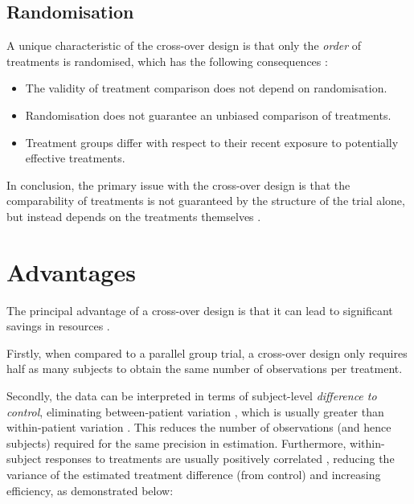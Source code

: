\documentclass[12pt, TexShade, letterpaper]{report}
\begin{document}
\subsection{Randomisation}
A unique characteristic of the cross-over design is that only the \textit{order} of treatments is randomised, which has the following consequences \cite{piantadosi2005clinical}:
\begin{itemize}
    \item The validity of treatment comparison does not depend on randomisation.
    \item Randomisation does not guarantee an unbiased comparison of treatments.
    \item Treatment groups differ with respect to their recent exposure to potentially effective treatments.
\end{itemize}
In conclusion, the primary issue with the cross-over design is that the comparability of treatments is not guaranteed by the structure of the trial alone, but instead depends on the treatments themselves \cite{piantadosi2005clinical}.

\section{Advantages}
The principal advantage of a cross-over design is that it can lead to significant savings in resources \cite{senn2002crossover}.

Firstly, when compared to a parallel group trial, a cross-over design only requires half as many subjects to obtain the same number of observations per treatment. 

Secondly, the data can be interpreted in terms of subject-level \textit{difference to control}, eliminating between-patient variation \cite{senn2002crossover}, which is usually greater than within-patient variation \cite{piantadosi2005clinical}. This reduces the number of observations (and hence subjects) required for the same precision in estimation. Furthermore, within-subject responses to treatments are usually positively correlated \cite{piantadosi2005clinical}, reducing the variance of the estimated treatment difference (from control) and increasing efficiency, as demonstrated below:
\end{document}
